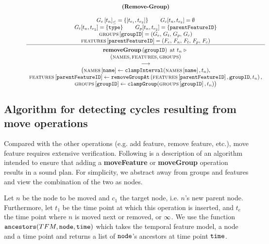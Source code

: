 \begin{figure}[h]
    \renewcommand{\arraystretch}{1.1}
    \sossize$$\begin{array}{c}
      \ntyperule{Remove-Group}
      {\\
        \containing{G_e}{t_n} = \set{\interval{t_{e_1}}{t_{e_2}}} \qquad
        G_c \interval{t_{n}}{t_{e_2}} = \emptyset \\
        G_t \interval{t_n}{t_{e_2}} = \set{\var{type}} \qquad
        G_p \interval{t_n}{t_{e_2}} = \set{\var{parentFeatureID}} \\
        \lookup{\groups{}}{\var{groupID}} = \left( G_e,\, G_t,\, G_p,\, G_c \right) \\
        \lookup{\features{}}{\var{parentFeatureID}} = \left( F_e,\, F_n,\, F_t,\, F_p,\, F_c \right)
      }
      {
        \textbf{removeGroup}\left( \var{groupID}\right) \text{ at } t_n \shove \\
        (\names{}, \features{}, \groups{}) \\
        \transition \\
        \big(\lookup{\names{}}{\var{name}} \assign \var{clampInterval}(\lookup{\names{}}{\var{name}}, t_n),\\
          \lookup{\features{}}{\var{parentFeatureID}} \assign \var{removeGroupAt}\left(\lookup{\features}{\var{parentFeatureID}}, \var{groupID}, t_n\right) ,\\
        \lookup{\groups{}}{\var{groupID}} \assign \var{clampGroup}(\lookup{\groups{}}{\var{groupID}}, t_n) \big)
      }
    \end{array}$$
  \caption{\label{rule:remove-group}}
\end{figure}

\subsection{Algorithm for detecting cycles resulting from \textbf{move} operations}
\label{sub:move-algorithm}

Compared with the other operations (e.g. add feature, remove feature, etc.), move feature requires extensive verification. Following is a description of an algorithm intended to ensure that adding a \textbf{moveFeature} or \textbf{moveGroup} operation results in a sound plan. For simplicity, we abstract away from groups and features and view the combination of the two as nodes. 

Let $n$ be the node to be moved and $c_1$ the target node, i.e. $n$'s new parent node. Furthermore, let $t_1$ be the time point at which this operation is inserted, and $t_e$ the time point where $n$ is moved next or removed, or $\infty$. We use the function $\texttt{ancestors}(TFM, \texttt{node}, \texttt{time})$ which takes the temporal feature model, a node and a time point and returns a list of $\texttt{node}$'s ancestors at time point $\texttt{time}$. 

